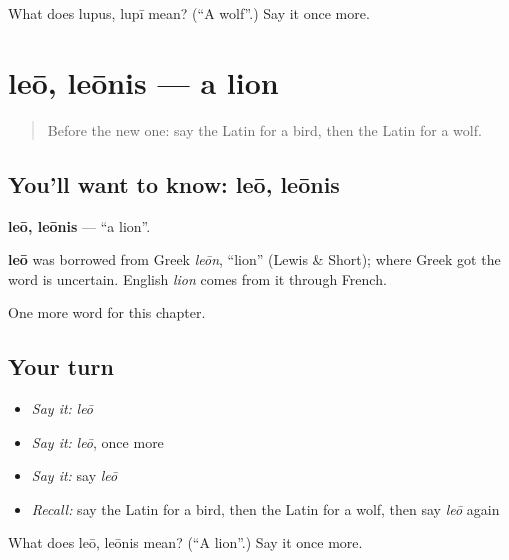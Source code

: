 \begin{tcolorbox}[breakable,colback=teal!4,colframe=teal!35!black,title={Before you move on}]
What does lupus, lupī mean? (\textquotedblleft{}A wolf\textquotedblright{}.) Say it once more.
\end{tcolorbox}
\section[leō, leōnis]{leō, leōnis — a lion}

\label{lesson:LA-C91-leo}



\begin{quote}
Before the new one: say the Latin for a bird, then the Latin for a wolf.
\end{quote}

\subsection*{You'll want to know: leō, leōnis}
\textbf{leō, leōnis} — \textquotedblleft{}a lion\textquotedblright{}.

\begin{cousinweb}
\textbf{leō} was borrowed from Greek \emph{leōn}, \textquotedblleft{}lion\textquotedblright{} (Lewis \& Short); where Greek got the word is uncertain. English \emph{lion} comes from it through French.
\end{cousinweb}

\begin{grammarlens}[title={What you've built}]
One more word for this chapter.
\end{grammarlens}

\subsection*{Your turn}
\begin{itemize}
\raggedright
  \item \emph{Say it:} \emph{leō}
  \item \emph{Say it:} \emph{leō}, once more
  \item \emph{Say it:} say \emph{leō}
  \item \emph{Recall:} say the Latin for a bird, then the Latin for a wolf, then say \emph{leō} again
\end{itemize}

\begin{tcolorbox}[breakable,colback=teal!4,colframe=teal!35!black,title={Before you move on}]
What does leō, leōnis mean? (\textquotedblleft{}A lion\textquotedblright{}.) Say it once more.
\end{tcolorbox}
